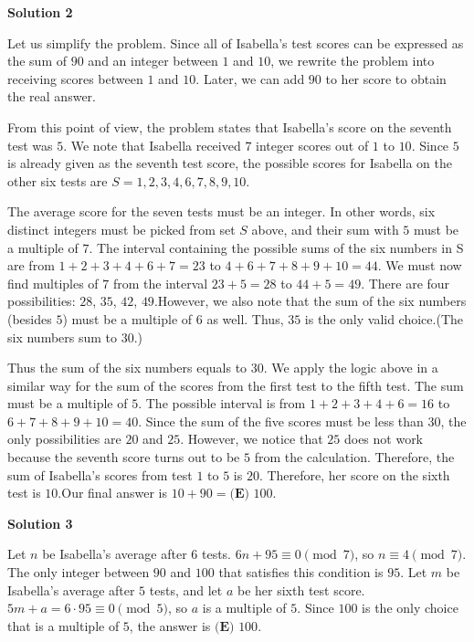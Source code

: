 \begin{enumerate}
\textbf{Solution 2}

Let us simplify the problem. Since all of Isabella's test scores can be expressed as the sum of $90$ and an integer between $1$ and $10$, we rewrite the problem into receiving scores between $1$ and $10$. Later, we can add $90$ to her score to obtain the real answer.

 From this point of view, the problem states that Isabella's score on the seventh test was $5$. We note that Isabella received $7$ integer scores out of $1$ to $10$. Since $5$ is already given as the seventh test score, the possible scores for Isabella on the other six tests are $S={1,2,3,4,6,7,8,9,10}$. 

 The average score for the seven tests must be an integer. In other words, six distinct integers must be picked from set $S$ above, and their sum with $5$ must be a multiple of $7$. The interval containing the possible sums of the six numbers in S are from $1 +2+3+4+6+7=23$ to $4+6+7+8+9+10=44$. We must now find multiples of $7$ from the interval $23+5 = 28$ to $44+5=49$. There are four possibilities: $28$, $35$, $42$, $49$.However, we also note that the sum of the six numbers (besides $5$) must be a multiple of $6$ as well. Thus, $35$ is the only valid choice.(The six numbers sum to $30$.)

 Thus the sum of the six numbers equals to $30$. We apply the logic above in a similar way for the sum of the scores from the first test to the fifth test. The sum must be a multiple of $5$. The possible interval is from $1+2+3+4+6=16$ to $6+7+8+9+10=40$. Since the sum of the five scores must be less than $30$, the only possibilities are $20$ and $25$. However, we notice that $25$ does not work because the seventh score turns out to be $5$ from the calculation. Therefore, the sum of Isabella's scores from test $1$ to $5$ is $20$. Therefore, her score on the sixth test is $10$.Our final answer is $10+90=  \boxed{\textbf{(E) }100}$.

 



\textbf{Solution 3}

Let $n$ be Isabella's average after $6$ tests. $6n+95 \equiv 0 \pmod{7}$, so $n \equiv 4 \pmod{7}$. The only integer between $90$ and $100$ that satisfies this condition is $95$. Let $m$ be Isabella's average after $5$ tests, and let $a$ be her sixth test score. $5m+a= 6\cdot95 \equiv 0 \pmod{5}$, so $a$ is a multiple of $5$. Since $100$ is the only choice that is a multiple of $5$, the answer is $\boxed{\textbf{(E) }100}$.


\end{enumerate}
